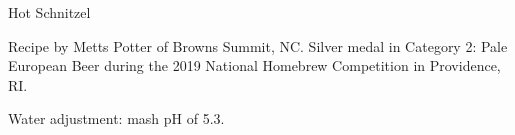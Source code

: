 \begin{recipe}{Hot Schnitzel} %

\begin{aboutblock}
Recipe by Metts Potter of Browns Summit, NC. Silver medal in Category 2: Pale
European Beer during the 2019 National Homebrew Competition in Providence, RI.
\sourceaha
\end{aboutblock}


\begin{methodandtiming}
 
\begin{mashsteps}
\end{mashsteps}

\begin{fermentationsteps}
\end{fermentationsteps}

\begin{directions}
Water adjustment: mash pH of 5.3.
\end{directions}

\end{methodandtiming}

\recipebreak

\begin{ingredientsblock}

\begin{malts}
\end{malts}

\begin{hops}
\end{hops}


\end{ingredientsblock}

\end{recipe}


